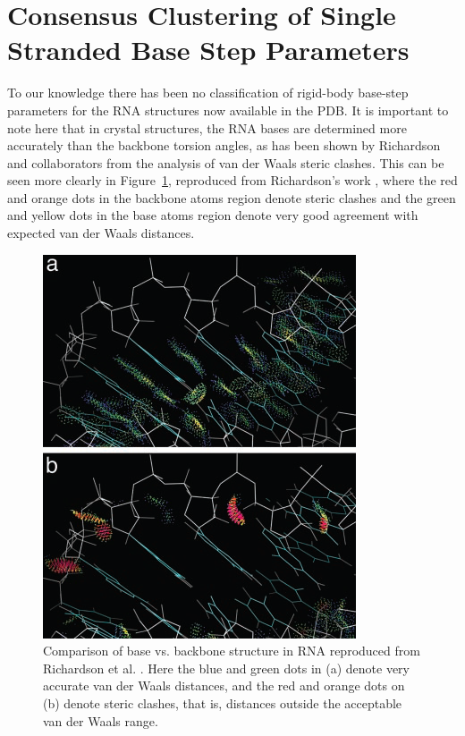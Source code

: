 \section{Consensus Clustering of Single Stranded Base Step Parameters}
To  our  knowledge there  has  been  no  classification of  rigid-body
base-step parameters  for the RNA structures now available in the PDB.  It is
important  to note  here that  in  crystal structures,  the RNA bases  are
determined more  accurately than the backbone torsion angles,  as has been
shown by Richardson  and collaborators from the analysis of  van der Waals
steric    clashes.    This    can    be   seen    more   clearly    in
Figure~\ref{fig:murray},    reproduced    from    Richardson's    work
\cite{murray2003}, where the red and orange dots in the backbone atoms
region denote steric clashes and the green and yellow dots in the base
atoms region  denote very good  agreement with expected van  der Waals
distances.
\begin{figure}[htbp]
 \centering
 \includegraphics[scale=0.5]{Chapter2/murray2003.png}
 \caption{Comparison of base vs. backbone structure in RNA reproduced
   from  Richardson et al. \cite{murray2003}. Here the  blue and  green dots  in  (a) denote  very accurate  van der  Waals
 distances, and  the red and  orange dots on (b) denote  steric clashes,
 that is, distances outside the acceptable van der Waals range.}
 \label{fig:murray}
\end{figure}

